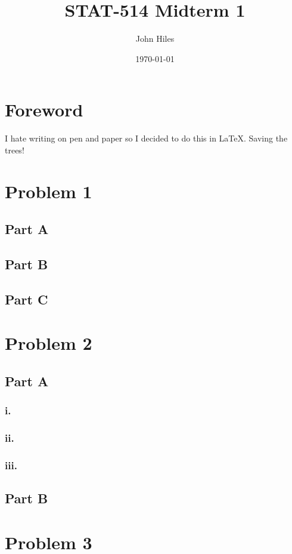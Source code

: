 \documentclass{article}
\title{STAT-514 Midterm 1}
\author{John Hiles}
\date\today
\begin{document}
\maketitle %

\section*{Foreword}
I hate writing on pen and paper so I decided to do this in LaTeX. Saving the trees!

\section*{Problem 1}
\subsection*{Part A}
\subsection*{Part B}
\subsection*{Part C}
\clearpage
\section*{Problem 2}
\subsection*{Part A}
\subsubsection*{i.}
\subsubsection*{ii.}
\subsubsection*{iii.}

\subsection*{Part B}

\clearpage
\section*{Problem 3}
\end{document}
